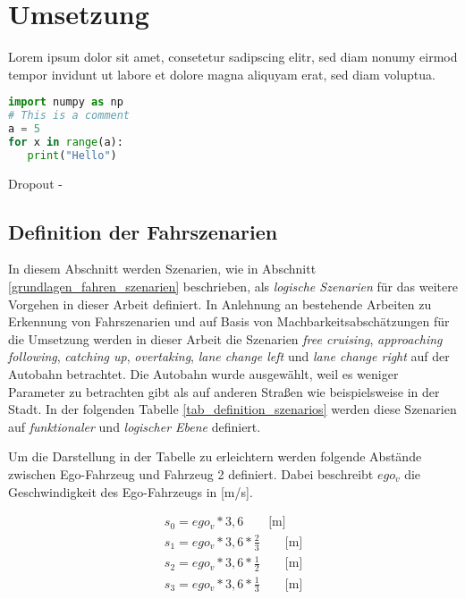
\chapter{Umsetzung}
\label{umsetzung}

Lorem ipsum dolor sit amet, consetetur sadipscing elitr, sed diam nonumy eirmod tempor invidunt ut labore et dolore magna aliquyam erat, sed diam voluptua.


\begin{lstlisting}[language=Python]
import numpy as np
# This is a comment
a = 5
for x in range(a):
   print("Hello")
\end{lstlisting}


Dropout - \cite{hinton2012improving}


\section{Definition der Fahrszenarien}
\label{umsetzung_definition}

In diesem Abschnitt werden Szenarien, wie in Abschnitt \ref{grundlagen_fahren_szenarien} beschrieben, als \textit{logische Szenarien} für das weitere Vorgehen in dieser Arbeit definiert. In Anlehnung an bestehende Arbeiten zu Erkennung von Fahrszenarien und auf Basis von Machbarkeitsabschätzungen für die Umsetzung werden in dieser Arbeit die Szenarien \textit{free cruising}, \textit{approaching} \textit{following}, \textit{catching up}, \textit{overtaking}, \textit{lane change left} und \textit{lane change right} auf der Autobahn betrachtet. Die Autobahn wurde ausgewählt, weil es weniger Parameter zu betrachten gibt als auf anderen Straßen wie beispielsweise in der Stadt. In der folgenden Tabelle \ref{tab_definition_szenarios} werden diese Szenarien auf \textit{funktionaler} und \textit{logischer Ebene} definiert.

Um die Darstellung in der Tabelle zu erleichtern werden folgende Abstände zwischen Ego-Fahrzeug und Fahrzeug 2 definiert. Dabei beschreibt $ego_v$ die Geschwindigkeit des Ego-Fahrzeugs in [m/s].

\begin{equation*}
\begin{split}
s_0 = ego_v * 3,6 \qquad \text{[m]} \\
s_1 = ego_v * 3,6 * \frac{2}{3} \qquad \text{[m]} \\
s_2 = ego_v * 3,6 * \frac{1}{2} \qquad \text{[m]} \\
s_3 = ego_v * 3,6 * \frac{1}{3} \qquad \text{[m]} \\
\end{split}
\end{equation*}

